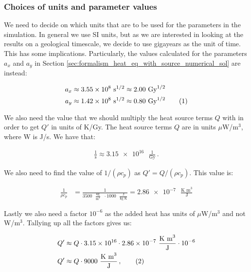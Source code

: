 \documentclass[reprint,english,notitlepage]{revtex4-1}  %
\newcommand\numberthis{\addtocounter{equation}{1}\tag{\theequation}}
\begin{document}
\subsubsection{Choices of units and parameter values} \label{sec:formalism_heat_units_parameters}

We need to decide on which units that are to be used for the parameters in the simulation. In general we use SI units, but as we are interested in looking at the results on a geological timescale, we decide to use gigayears as the unit of time. This has some implications. Particularly, the values calculated for the parameters $a_x$ and $a_y$ in Section \ref{sec:formalism_heat_eq_with_source_numerical_sol} are instead:

\begin{align*}
a_x &\approx \num{3.55e8} \text{ s}^{1/2} \approx 2.00 \text{ Gy}^{1/2} \\
a_y &\approx \num{1.42e8} \text{ s}^{1/2} \approx 0.80 \text{ Gy}^{1/2} \numberthis \label{eq:parameters_xyscale}
\end{align*}

We also need the value that we should multiply the heat source terms $Q$ with in order to get $Q'$ in units of K/Gy. The heat source terms $Q$ are in units $\mu$W/m$^3$, where W is J/s. We have that:

\begin{align*}
\frac{1}{\text{s}} \approx \num{3.15e16} \text{ }\frac{1}{\text{Gy}} \, .
\end{align*} 

We also need to find the value of $1/(\rho c_p)$ as $Q' = Q/(\rho c_p)$. This value is:

\begin{align*}
\frac{1}{\rho c_p} &= \frac{1}{3500 \text{ } \frac{\text{kg}}{\text{m}^3} \text{ } \cdot 1000 \text{ } \frac{\text{J}}{\text{kg K}}} = \num{2.86e-7} \text{ } \frac{\text{K m}^3}{\text{J}}
\end{align*}

Lastly we also need a factor $10^{-6}$ as the added heat has units of $\mu$W/m$^3$ and not W/m$^3$. Tallying up all the factors gives us:

\begin{align*}
Q' &\approx Q \cdot \num{3.15e16} \cdot \num{2.86e-7} \text{ } \frac{\text{K m}^3}{\text{J}} \cdot 10^{-6} \\
Q' &\approx Q \cdot 9000 \text{ } \frac{\text{K m}^3}{\text{J}} \, , \numberthis \label{eq:parameters_heat_transform}
\end{align*}
\end{document}

